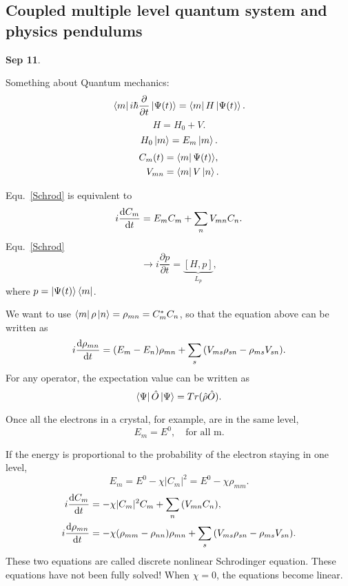 \subsection{Coupled multiple level quantum system and physics pendulums}\label{sec:quantumlevels}
\textbf{Sep 11}.

Something about Quantum mechanics:
\begin{equation}
\mathinner{\langle{m}|}i\hbar \frac{\partial}{\partial t} \mathinner{|{\Psi(t)}\rangle}=\mathinner{\langle{m}|}H\mathinner{|{\Psi(t)}\rangle}.\label{Schrod}
\end{equation}
\begin{equation}
H=H_0 + V.
\end{equation}
\begin{equation}
H_0 \mathinner{|{m}\rangle} = E_m \mathinner{|{m}\rangle}.
\end{equation}
\begin{align}
C_m(t)&=\mathinner{\langle{m}|}\Psi(t)\rangle,\\
V_{mn} &= \mathinner{\langle{m}|}V\mathinner{|{n}\rangle}.
\end{align}

Equ.~\ref{Schrod} is equivalent to 
\begin{equation}
i \frac{{\mathrm d} {C_m}}{{\mathrm d}t}= E_m C_m + \sum_n {V_{mn}C_n}. 
\end{equation}
Equ.~\ref{Schrod}
\begin{equation}
\rightarrow i\frac{\partial p}{\partial t}=\underbrace{[H,p]}_{L_p},
\end{equation}
where $ p=\mathinner{|{\Psi (t)}\rangle}\mathinner{\langle{m}|} $. 

We want to use $ \mathinner{\langle{m}|} \rho \mathinner{|{n}\rangle} = \rho_{mn}=C_m^* C_n$, so that the equation above can be written as 
\begin{equation}
i\frac{{\mathrm d} {\rho_{mn}}}{{\mathrm d}t}=(E_m-E_n)\rho_{mn}+ \sum_s{\left( V_{ms}\rho_{sn}-\rho_{ms} V_{sn} \right)}.
\end{equation}
For any operator, the expectation value can be written as
\begin{equation}
\mathinner{\langle{\Psi}|}{\hat{O}}\mathinner{|{\Psi}\rangle}=Tr(\hat{\rho}\hat{O}).
\end{equation}

Once all the electrons in a crystal, for example, are in the same level,
\begin{equation}
E_m =E^0, \quad \text{for all m.}
\end{equation}


If the energy is proportional to the probability of the electron staying in one level,
\begin{equation}
E_m=E^0 - \chi |C_m | ^2 = E^0 -\chi \rho_{mm}. 
\end{equation}
\begin{align}
i\frac{{\mathrm d} {C_{m}}}{{\mathrm d}t} &=-\chi |C_m|^2 C_{m}+ \sum_n{\left( V_{mn}C_{n} \right)},\\
i\frac{{\mathrm d} {\rho_{mn}}}{{\mathrm d}t} &=-\chi  (\rho_{mm}-\rho_{nn})\rho_{mn} + \sum_s{\left( V_{ms}\rho_{sn}-\rho_{ms} V_{sn} \right)}.
\end{align}
These two equations are called discrete nonlinear Schrodinger equation. These equations have not been fully solved!
When $ \chi=0 $, the equations become linear.

